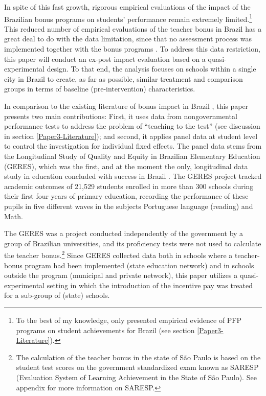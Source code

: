 \documentclass[a4paper, 12pt]{article}
\begin{document}
In spite of this fast growth, rigorous empirical evaluations of the impact of the Brazilian bonus programs on students’ performance remain extremely limited.\footnote{To the best of my knowledge, only \citet{lepine2016teacher, oshiro2015impacto} presented empirical evidence of PFP programs on student achievements for Brazil (see section \ref{Paper3-Literature}).} This reduced number of empirical evaluations of the teacher bonus in Brazil has a great deal to do with the data limitation, since that no assessment process was implemented together with the bonus programs \citep{bresolin2014analise}. To address this data restriction, this paper will conduct an ex-post impact evaluation based on a quasi-experimental design. To that end, the analysis focuses on schools within a single city in Brazil to create, as far as possible, similar treatment and comparison groups in terms of baseline (pre-intervention) characteristics.


In comparison to the existing literature of bonus impact in Brazil \citep[see][]{lepine2016teacher, oshiro2015impacto}, this paper presents two main contributions: First, it uses data from nongovernmental performance tests to address the problem of “teaching to the test” (see discussion in section \ref{Paper3-Literature}); and second, it applies panel data at student level to control the investigation for individual fixed effects. The panel data stems from the Longitudinal Study of Quality and Equity in Brazilian Elementary Education (GERES), which was the first, and at the moment the only, longitudinal data study in education concluded with success in Brazil \citep{brooke2011geres}. The GERES project tracked academic outcomes of 21,529 students enrolled in more than 300 schools during their first four years of primary education, recording the performance of these pupils in five different waves in the subjects Portuguese language (reading) and Math. 



The GERES was a project conducted independently of the government by a group of Brazilian universities, and its proficiency tests were not used to calculate the teacher bonus.\footnote{The calculation of the teacher bonus in the state of São Paulo is based on the student test scores on the government standardized exam known as SARESP (Evaluation System of Learning Achievement in the State of São Paulo). See appendix for more information on SARESP.} Since GERES collected data both in schools where a teacher-bonus program had been implemented (state education network) and in schools outside the program (municipal and private network), this paper utilizes a quasi-experimental setting in which the introduction of the incentive pay was treated for a sub-group of (state) schools.
\end{document}
